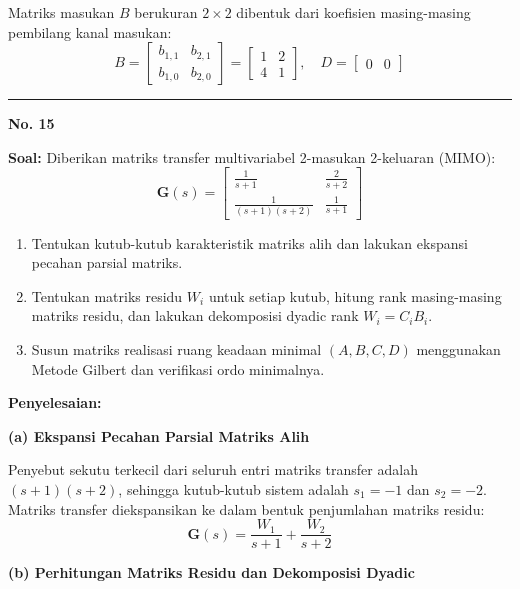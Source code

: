 \documentclass[11pt,a4paper]{article}
\begin{document}
Matriks masukan $B$ berukuran $2 \times 2$ dibentuk dari koefisien masing-masing pembilang kanal masukan:
$$B = \begin{bmatrix} b_{1,1} & b_{2,1} \\ b_{1,0} & b_{2,0} \end{bmatrix} = \begin{bmatrix} 1 & 2 \\ 4 & 1 \end{bmatrix}, \quad D = \begin{bmatrix} 0 & 0 \end{bmatrix}$$

\vspace{12pt}
\hrule
\vspace{10pt}

\textbf{\large No. 15}

\textbf{Soal:}  
Diberikan matriks transfer multivariabel 2-masukan 2-keluaran (MIMO):
$$\mathbf{G}(s) = \begin{bmatrix} \frac{1}{s+1} & \frac{2}{s+2} \\ \frac{1}{(s+1)(s+2)} & \frac{1}{s+1} \end{bmatrix}$$
\begin{enumerate}[label=(\alph*)]
    \item Tentukan kutub-kutub karakteristik matriks alih dan lakukan ekspansi pecahan parsial matriks.
    \item Tentukan matriks residu $W_i$ untuk setiap kutub, hitung rank masing-masing matriks residu, dan lakukan dekomposisi dyadic rank $W_i = C_i B_i$.
    \item Susun matriks realisasi ruang keadaan minimal $(A, B, C, D)$ menggunakan Metode Gilbert dan verifikasi ordo minimalnya.
\end{enumerate}

\textbf{Penyelesaian:}

\textbf{(a) Ekspansi Pecahan Parsial Matriks Alih}

Penyebut sekutu terkecil dari seluruh entri matriks transfer adalah $(s+1)(s+2)$, sehingga kutub-kutub sistem adalah $s_1 = -1$ dan $s_2 = -2$. Matriks transfer diekspansikan ke dalam bentuk penjumlahan matriks residu:
$$\mathbf{G}(s) = \frac{W_1}{s + 1} + \frac{W_2}{s + 2}$$

\textbf{(b) Perhitungan Matriks Residu dan Dekomposisi Dyadic}
\end{document}
